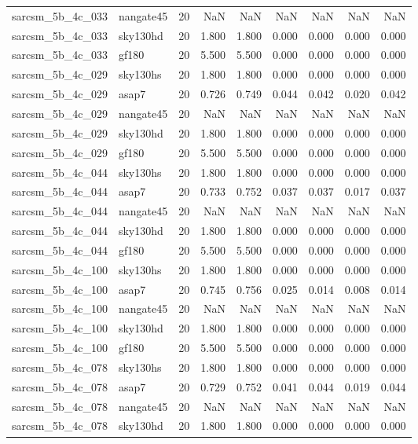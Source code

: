 \begin{tabular}{llrrrrrrr}
sarcsm\_5b\_4c\_033 & nangate45 & 20 & NaN & NaN & NaN & NaN & NaN & NaN \\
sarcsm\_5b\_4c\_033 & sky130hd & 20 & 1.800 & 1.800 & 0.000 & 0.000 & 0.000 & 0.000 \\
sarcsm\_5b\_4c\_033 & gf180 & 20 & 5.500 & 5.500 & 0.000 & 0.000 & 0.000 & 0.000 \\
sarcsm\_5b\_4c\_029 & sky130hs & 20 & 1.800 & 1.800 & 0.000 & 0.000 & 0.000 & 0.000 \\
sarcsm\_5b\_4c\_029 & asap7 & 20 & 0.726 & 0.749 & 0.044 & 0.042 & 0.020 & 0.042 \\
sarcsm\_5b\_4c\_029 & nangate45 & 20 & NaN & NaN & NaN & NaN & NaN & NaN \\
sarcsm\_5b\_4c\_029 & sky130hd & 20 & 1.800 & 1.800 & 0.000 & 0.000 & 0.000 & 0.000 \\
sarcsm\_5b\_4c\_029 & gf180 & 20 & 5.500 & 5.500 & 0.000 & 0.000 & 0.000 & 0.000 \\
sarcsm\_5b\_4c\_044 & sky130hs & 20 & 1.800 & 1.800 & 0.000 & 0.000 & 0.000 & 0.000 \\
sarcsm\_5b\_4c\_044 & asap7 & 20 & 0.733 & 0.752 & 0.037 & 0.037 & 0.017 & 0.037 \\
sarcsm\_5b\_4c\_044 & nangate45 & 20 & NaN & NaN & NaN & NaN & NaN & NaN \\
sarcsm\_5b\_4c\_044 & sky130hd & 20 & 1.800 & 1.800 & 0.000 & 0.000 & 0.000 & 0.000 \\
sarcsm\_5b\_4c\_044 & gf180 & 20 & 5.500 & 5.500 & 0.000 & 0.000 & 0.000 & 0.000 \\
sarcsm\_5b\_4c\_100 & sky130hs & 20 & 1.800 & 1.800 & 0.000 & 0.000 & 0.000 & 0.000 \\
sarcsm\_5b\_4c\_100 & asap7 & 20 & 0.745 & 0.756 & 0.025 & 0.014 & 0.008 & 0.014 \\
sarcsm\_5b\_4c\_100 & nangate45 & 20 & NaN & NaN & NaN & NaN & NaN & NaN \\
sarcsm\_5b\_4c\_100 & sky130hd & 20 & 1.800 & 1.800 & 0.000 & 0.000 & 0.000 & 0.000 \\
sarcsm\_5b\_4c\_100 & gf180 & 20 & 5.500 & 5.500 & 0.000 & 0.000 & 0.000 & 0.000 \\
sarcsm\_5b\_4c\_078 & sky130hs & 20 & 1.800 & 1.800 & 0.000 & 0.000 & 0.000 & 0.000 \\
sarcsm\_5b\_4c\_078 & asap7 & 20 & 0.729 & 0.752 & 0.041 & 0.044 & 0.019 & 0.044 \\
sarcsm\_5b\_4c\_078 & nangate45 & 20 & NaN & NaN & NaN & NaN & NaN & NaN \\
sarcsm\_5b\_4c\_078 & sky130hd & 20 & 1.800 & 1.800 & 0.000 & 0.000 & 0.000 & 0.000 \\

\end{tabular}
